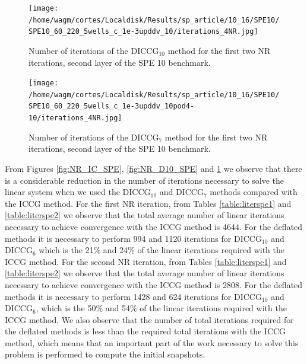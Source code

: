 \documentclass[12pt]{article}
\begin{document}
\begin{figure}[!ht]
\centering
\begin{minipage}{.4\textwidth}
\hspace{-1cm}
\texttt{[image: /home/wagm/cortes/Localdisk/Results/sp\_article/10\_16/SPE10/SPE10\_60\_220\_5wells\_c\_1e-3upddv\_10/iterations\_4NR.jpg]}
\vspace{-1.3cm}
\caption{Number of iterations of the DICCG$_{10}$ method for the first two NR iterations, second layer of the SPE 10 benchmark.}
\label{fig:NR_D10_SPE}
\end{minipage}%
\hspace{15mm}
\begin{minipage}{.4\textwidth}
\hspace{-1cm}
\texttt{[image: /home/wagm/cortes/Localdisk/Results/sp\_article/10\_16/SPE10/SPE10\_60\_220\_5wells\_c\_1e-3upddv\_10pod4-10/iterations\_4NR.jpg]}
\vspace{-1.3cm}
\caption{Number of iterations of the DICCG$_{7}$ method for the first two NR iterations, second layer of the SPE 10 benchmark.}
\label{fig:NR_D6_SPE}
\end{minipage}
\end{figure}

\begin{figure}[!h]
\centering

\end{figure}

From Figures \ref{fig:NR_IC_SPE}, \ref{fig:NR_D10_SPE} and \ref{fig:NR_D6_SPE} we observe that there is a considerable reduction in the number of iterations necessary to solve the linear system when we used the DICCG$_{10}$ and DICCG$_7$ methods compared with the ICCG method. For the first NR iteration, from Tables \ref{table:literspe1} and \ref{table:literspe2} we observe that the total average number of linear iterations necessary to achieve convergence with the ICCG method is 4644. For the deflated methods it is necessary to perform 994 and 1120 iterations for DICCG$_{10}$ and DICCG$_6$ which is the 21\% and 24\% of the linear iterations required with the ICCG method. For the second NR iteration, from Tables \ref{table:literspe1} and \ref{table:literspe2} we observe that the total average number of linear iterations necessary to achieve convergence with the ICCG method is 2808. For the deflated methods it is necessary to perform 1428 and 624 iterations for DICCG$_{10}$ and DICCG$_6$, which is the 50\% and 
54\% of the linear iterations required with the ICCG method. 
We also observe that the number of total iterations required for the deflated methods is less than the required total iterations with the ICCG method, which means that an important part of the work necessary to solve this problem is performed to compute the initial snapshots.
\end{document}
